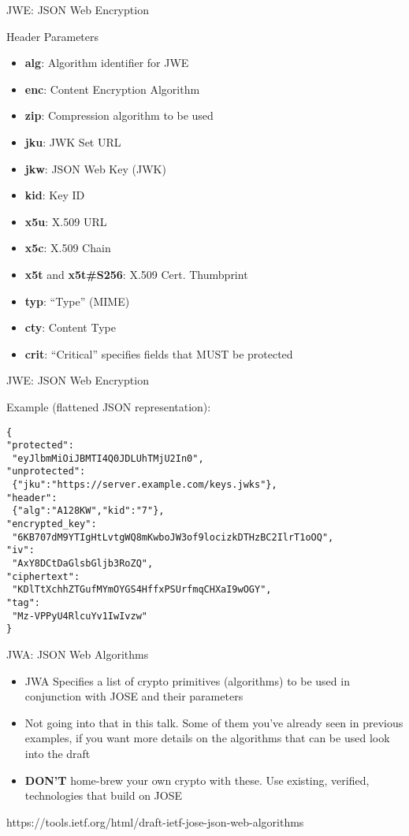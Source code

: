 \begin{frame}{JWE: JSON Web Encryption}

Header Parameters

\begin{itemize}
\itemsep1pt\parskip0pt
\item
  \textbf{alg}: Algorithm identifier for JWE
\item
  \textbf{enc}: Content Encryption Algorithm
\item
  \textbf{zip}: Compression algorithm to be used
\item
  \textbf{jku}: JWK Set URL
\item
  \textbf{jkw}: JSON Web Key (JWK)
\item
  \textbf{kid}: Key ID
\item
  \textbf{x5u}: X.509 URL
\item
  \textbf{x5c}: X.509 Chain
\item
  \textbf{x5t} and \textbf{x5t\#S256}: X.509 Cert. Thumbprint
\item
  \textbf{typ}: ``Type'' (MIME)
\item
  \textbf{cty}: Content Type
\item
  \textbf{crit}: ``Critical'' specifies fields that MUST be protected
\end{itemize}

\end{frame}

\begin{frame}[fragile]{JWE: JSON Web Encryption}

Example (flattened JSON representation):

\small

\begin{verbatim}
{
"protected":
 "eyJlbmMiOiJBMTI4Q0JDLUhTMjU2In0",
"unprotected":
 {"jku":"https://server.example.com/keys.jwks"},
"header":
 {"alg":"A128KW","kid":"7"},
"encrypted_key":
 "6KB707dM9YTIgHtLvtgWQ8mKwboJW3of9locizkDTHzBC2IlrT1oOQ",
"iv":
 "AxY8DCtDaGlsbGljb3RoZQ",
"ciphertext":
 "KDlTtXchhZTGufMYmOYGS4HffxPSUrfmqCHXaI9wOGY",
"tag":
 "Mz-VPPyU4RlcuYv1IwIvzw"
}
\end{verbatim}

\end{frame}

\begin{frame}{JWA: JSON Web Algorithms}

\begin{itemize}
\item
  JWA Specifies a list of crypto primitives (algorithms) to be used in
  conjunction with JOSE and their parameters
\item
  Not going into that in this talk. Some of them you've already seen in
  previous examples, if you want more details on the algorithms that can
  be used look into the draft
\item
  \textbf{DON'T} home-brew your own crypto with these. Use existing,
  verified, technologies that build on JOSE
\end{itemize}

https://tools.ietf.org/html/draft-ietf-jose-json-web-algorithms

\end{frame}

